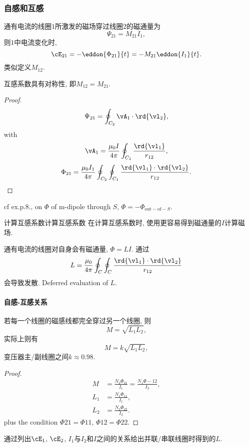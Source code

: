 \documentclass{ctexart}
\begin{document}

\subsubsection{自感和互感} %
\label{ssub:自感和互感}

通有电流的线圈$1$所激发的磁场穿过线圈$2$的磁通量为
\[ \Psi_{21} = M_{21}I_1, \]
则$1$中电流变化时,
\[ \cE_{21} = -\eddon{\Phi_{21}}{t} = -M_{21}\eddon{I_1}{t}. \]
类似定义$M_{12}$.
\begin{finale}
	互感系数具有对称性, 即$M_{12}=M_{21}$.
\end{finale}
\begin{proof}
	\[ \Psi_{21} = \oint_{C_2} \vA_1\cdot\rd{\vl_2}, \]
	with
	\[ \vA_1 = \frac{\mu_0 I}{4\pi} \oint_{C_1}\frac{\rd{\vl_1}}{r_{12}}, \]
	\[ \Phi_{21} = \frac{\mu_0 I_1}{4\pi} \oint_{C_2}\oint_{C_1}\frac{\rd{\vl_1}\cdot\rd{\vl_2}}{r_{12}}. \]
\end{proof}
\begin{pitfall}
	cf ex.p.8., on $\Phi$ of m-dipole through $S$, $\Phi = -\Phi_{\mathrm{out-of-}S}$.
\end{pitfall}
\begin{reflex}{计算互感系数}{计算互感系数}
	在计算互感系数时, 使用更容易得到磁通量的$I$计算磁场.
\end{reflex}
通有电流的线圈对自身会有磁通量, $\Phi = LI$. 通过
\[ L = \frac{\mu_0}{4\pi} \oint_C\oint_C \frac{\rd{\vl_1}\cdot\rd{\vl_2}}{r_{12}} \]
会导致发散. Deferred evaluation of $L$.
\paragraph{自感-互感关系} %
\label{par:自感_互感关系}

若每一个线圈的磁感线都完全穿过另一个线圈, 则
\[ M = \sqrt{L_1 L_2}, \]
实际上则有
\[ M = k\sqrt{L_1 L_2}, \]
变压器主/副线圈之间$k\approx 0.98$.
\begin{proof}
	\begin{align*}
		M&= \frac{N_2\Phi_{21}}{I_1} = \frac{N_1\Phi-{12}}{I_2},\\
		L_1 &= \frac{N_1\Phi_11}{I_1},\\
		L_2 &= \frac{N_2\Phi_{22}}{I_2}.
	\end{align*}
	plus the condition $\Phi{21}=\Phi{11}$, $\Phi{12}=\Phi{22}$.
\end{proof}
\begin{ex}
	通过列出$\cE_1$, $\cE_2$, $I_1$与$I_2$和$I$之间的关系给出并联/串联线圈时得到的$L$.
\end{ex}




\end{document}
